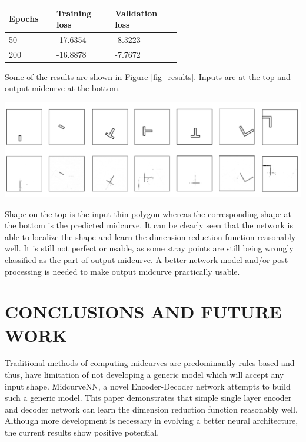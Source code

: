\documentclass[9pt,academicons]{article}
\begin{document}
\begin{table}[h]
\centering

\begin{tabular}[htbp]{@{} p{0.14\linewidth}  p{0.22\linewidth}  p{0.22\linewidth}  @{}} \toprule
{\bf Epochs } & {\bf Training loss }  & {\bf Validation loss} \\
\midrule
50	& -17.6354	& -8.3223\\
200	& -16.8878	& -7.7672 \\
\bottomrule
\end{tabular}
\label{tbl_loss}
\end{table}


Some of the results are shown in Figure \ref{fig_results}. Inputs are at the top and output midcurve at the bottom.

     \begin{center}
	\includegraphics[width=\linewidth]{images/midcurvenn_results}
	\label{fig_results}
    \end{center}

Shape on the top is the input thin polygon whereas the corresponding shape at the bottom is the predicted midcurve. It can be clearly seen that the network is able to localize the shape and learn the dimension reduction function reasonably well. It is still not perfect or usable, as some stray points are still being wrongly classified as the part of output midcurve. A better network model and/or post processing is needed to make output midcurve practically usable.


\section{CONCLUSIONS AND FUTURE WORK}

Traditional methods of computing midcurves are predominantly rules-based and thus, have limitation of not developing a generic model which will accept any input shape. MidcurveNN, a novel Encoder-Decoder network attempts to build such a generic model. This paper demonstrates that simple single layer encoder and decoder network can learn the dimension reduction function reasonably well. Although more development is necessary in evolving a better neural architecture, the current results show positive potential. 
\end{document}
